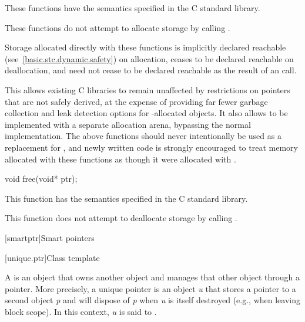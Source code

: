 \begin{itemdescr}
\pnum
\effects
These functions have the semantics specified in the C standard library.

\pnum
\remarks
These functions do not attempt to allocate
storage by calling .
%

\pnum
Storage allocated directly with these functions
is implicitly declared reachable
(see~\ref{basic.stc.dynamic.safety}) on allocation, ceases to be declared
reachable on deallocation, and need not cease to be declared reachable as the
result of an  call. \begin{note} This allows existing
C libraries to remain unaffected by restrictions on pointers that are not safely
derived, at the expense of providing far fewer garbage collection and leak
detection options for -allocated objects. It also allows
 to be implemented with a separate allocation arena, bypassing
the normal  implementation. The above functions
should never intentionally be used as a replacement for
, and newly written code is strongly encouraged to
treat memory allocated with these functions as though it were allocated with
. \end{note}
\end{itemdescr}

%
\begin{itemdecl}
void free(void* ptr);
\end{itemdecl}

\begin{itemdescr}
\pnum
\effects
This function has the semantics specified in the C standard library.

\pnum
\remarks
This function does not attempt to
deallocate storage by calling
.
\end{itemdescr}


[smartptr]{Smart pointers}

[unique.ptr]{Class template }

\pnum
A  is an object that owns another object and
manages that other object through a pointer. More precisely, a unique pointer
is an object \textit{u} that stores a pointer to a second object \textit{p} and
will dispose of \textit{p} when \textit{u} is itself destroyed (e.g., when
leaving block scope). In this context, \textit{u} is said
to  .

